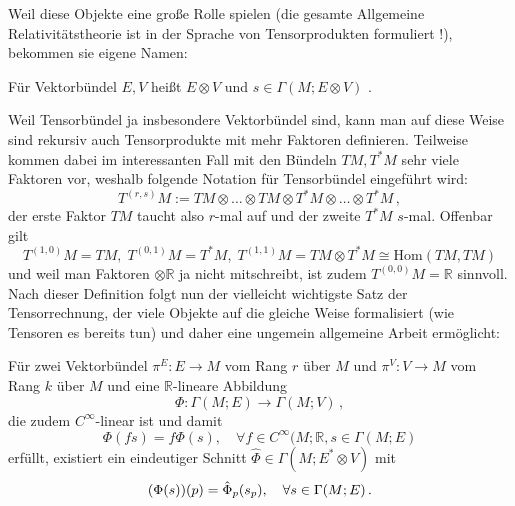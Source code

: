\documentclass[../H_Analysis_main.tex]{subfiles}
\begin{document}
Weil diese Objekte eine große Rolle spielen (die gesamte Allgemeine Relativitätstheorie ist in der Sprache von Tensorprodukten formuliert !), bekommen sie eigene Namen:
\begin{defi}
Für Vektorbündel $E, V$ heißt $E \otimes V$  und $s \in \Gamma(M; E \otimes V)$ .
\end{defi}


Weil Tensorbündel ja insbesondere Vektorbündel sind, kann man auf diese Weise sind rekursiv auch Tensorprodukte mit mehr Faktoren definieren. Teilweise kommen dabei im interessanten Fall mit den Bündeln $TM, T^*M$ sehr viele Faktoren vor, weshalb folgende Notation für Tensorbündel eingeführt wird:
\begin{equation}
T^{(r, s)}M := TM \otimes \dots \otimes TM \otimes T^*M \otimes \dots \otimes T^*M \, ,
\end{equation}
der erste Faktor $TM$ taucht also $r$-mal auf und der zweite $T^*M$ $s$-mal. Offenbar gilt
\begin{equation*}
T^{(1, 0)}M = TM, \; T^{(0, 1)}M = T^*M, \; T^{(1, 1)}M = TM \otimes T^*M \cong \text{Hom}(TM, TM)
\end{equation*}
und weil man Faktoren $\otimes \mathbb{R}$ ja nicht mitschreibt, ist zudem $T^{(0, 0)}M = \mathbb{R}$ sinnvoll.\\


Nach dieser Definition folgt nun der vielleicht wichtigste Satz der Tensorrechnung, der viele Objekte auf die gleiche Weise formalisiert (wie Tensoren es bereits tun) und daher eine ungemein allgemeine Arbeit ermöglicht:
\begin{satz}\label{satz:tenseigsch}
Für zwei Vektorbündel $\pi^E: E \rightarrow M$ vom Rang $r$ über $M$ und $\pi^V: V \rightarrow M$ vom Rang $k$ über $M$ und eine $\mathbb{R}$-lineare Abbildung
\begin{equation*}
\Phi: \Gamma(M; E) \rightarrow \Gamma(M; V) \, ,
\end{equation*}
die zudem $C^\infty$-linear ist und damit
\begin{equation}
\Phi(f s) = f \Phi(s), \quad \forall f \in C^\infty(M; \mathbb{R}, s \in \Gamma(M ;E)
\end{equation}
erfüllt, existiert ein eindeutiger Schnitt $\hat{\Phi} \in \Gamma(M; E^* \otimes V)$ mit
\begin{equation}
\qty(\Phi(s))(p) = \hat{\Phi}_p(s_p), \quad \forall s \in \Gamma(M; E) \, .
\end{equation}
\end{satz}
\end{document}
